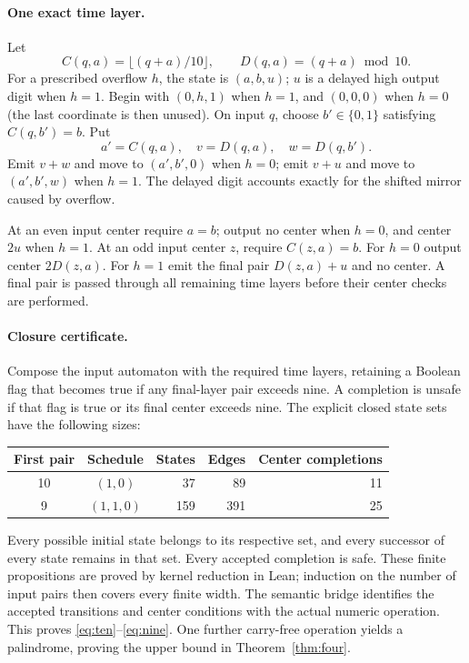 \documentclass[11pt]{article}
\begin{document}
\paragraph{One exact time layer.}
Let
\[
 C(q,a)=\lfloor(q+a)/10\rfloor,\qquad D(q,a)=(q+a)\bmod10.
\]
For a prescribed overflow $h$, the state is $(a,b,u)$; $u$ is a delayed high
output digit when $h=1$. Begin with $(0,h,1)$ when $h=1$, and $(0,0,0)$
when $h=0$ (the last coordinate is then unused). On input $q$, choose
$b'\in\{0,1\}$ satisfying $C(q,b')=b$. Put
\[
 a'=C(q,a),\quad v=D(q,a),\quad w=D(q,b').
\]
Emit $v+w$ and move to $(a',b',0)$ when $h=0$; emit $v+u$ and move to
$(a',b',w)$ when $h=1$. The delayed digit accounts exactly for the shifted
mirror caused by overflow.

At an even input center require $a=b$; output no center when $h=0$, and
center $2u$ when $h=1$. At an odd input center $z$, require $C(z,a)=b$.
For $h=0$ output center $2D(z,a)$. For $h=1$ emit the final pair $D(z,a)+u$
and no center. A final pair is passed through all remaining time layers
before their center checks are performed.

\paragraph{Closure certificate.}
Compose the input automaton with the required time layers, retaining a
Boolean flag that becomes true if any final-layer pair exceeds nine. A
completion is unsafe if that flag is true or its final center exceeds nine.
The explicit closed state sets have the following sizes:
\begin{center}
\begin{tabular}{ccrrr}
\toprule
First pair&Schedule&States&Edges&Center completions\\
\midrule
10&$(1,0)$&37&89&11\\
9&$(1,1,0)$&159&391&25\\
\bottomrule
\end{tabular}
\end{center}
Every possible initial state belongs to its respective set, and every
successor of every state remains in that set. Every accepted
completion is safe. These finite propositions are proved by kernel reduction
in Lean; induction on the number of input pairs then covers every finite
width. The semantic bridge identifies the accepted transitions and center
conditions with the actual numeric operation. This proves
\eqref{eq:ten}--\eqref{eq:nine}. One further carry-free operation yields a
palindrome, proving the upper bound in Theorem~\ref{thm:four}.
\end{document}
